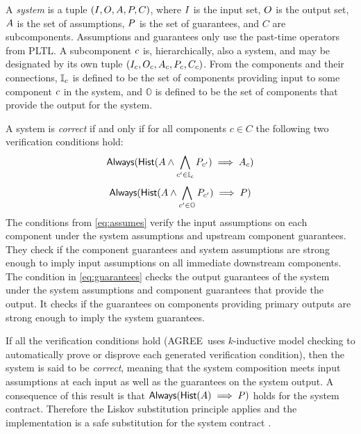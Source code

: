 \documentclass[global,twocolumn]{svjour}
\newcommand{\agr}{AGREE}
\begin{document}
A \emph{system} is a tuple $(I, O, A, P,C)$, where $I$ is the input set, $O$ is the output set, $A$ is the set of assumptions, $P$ is the set of guarantees, and $C$ are subcomponents.
%
Assumptions and guarantees only use the past-time operators from PLTL.
%
A subcomponent $c$ is, hierarchically, also a system, and may be designated by its own tuple $(I_{c}, O_{c}, A_{c}, P_{c}, C_c)$.
%
From the components and their connections, $\mathbb{I}_{c}$ is defined to be the set of components providing input to some component $c$ in the system, and $\mathbb{O}$ is defined to be the set of components that provide the output for the system.

A system is \emph{correct} if and only if for all components $c \in C$ the following two verification conditions hold:
%
\begin{equation}\label{eq:assumes}
            \mathsf{Always}(\mathsf{Hist}(A \wedge
            \bigwedge_{c^\prime \in \mathbb{I}_{c}} P_{c^\prime})
            \implies A_{c})
\end{equation}
%
\begin{equation}\label{eq:guarantees}
            \mathsf{Always}(\mathsf{Hist}(A \wedge
            \bigwedge_{c^\prime \in \mathbb{O}} P_{c^\prime})
            \implies P)
\end{equation}
%
The conditions from \eqref{eq:assumes} verify the input assumptions on each component under the system assumptions and upstream component guarantees.
%
They check if the component guarantees and system assumptions are strong enough to imply input assumptions on all immediate downstream components.
%
The condition in \eqref{eq:guarantees} checks the output guarantees of the system under the system assumptions and component guarantees that provide the output.
%
It checks if the guarantees on components providing primary outputs are strong enough to imply the system guarantees.

If all the verification conditions hold (\agr\ uses $k$-inductive model checking to automatically prove or disprove each generated verification condition), then the system is said to be \emph{correct}, meaning that the system composition meets input assumptions at each input as well as the guarantees on the system output.
%
A consequence of this result is that $\mathsf{Always}(\mathsf{Hist}(A) \implies P)$ holds for the system contract.
%
Therefore the Liskov substitution principle applies and the implementation is a safe substitution for the system contract \cite{10.1145/62139.62141}.
\end{document}
